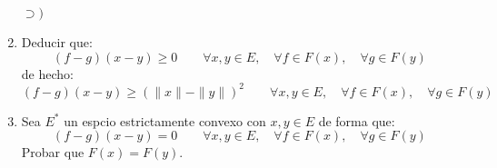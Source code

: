 \begin{ejercicio}
\begin{enumerate}[label=\alph*)]
\begin{description}
\begin{equation*}
                    \end{equation*}
                \item [$\supset )$] 
            \end{description}
        \item Deducir que:
            \begin{equation*}
                (f-g)(x-y) \geq 0 \qquad \forall x,y\in E, \quad \forall f\in F(x), \quad \forall g\in F(y)
            \end{equation*}
            de hecho:
            \begin{equation*}
                (f-g)(x-y) \geq {(\|x\|- \|y\|)}^{2} \qquad \forall x,y\in E, \quad \forall f\in F(x), \quad \forall g\in F(y)
            \end{equation*}
        \item Sea $E^\ast$ un espcio estrictamente convexo con $x,y\in E$ de forma que:
            \begin{equation*}
                (f-g)(x-y) = 0 \qquad \forall x,y\in E, \quad \forall f\in F(x), \quad \forall g\in F(y)
            \end{equation*}
            Probar que $F(x) = F(y)$.
    \end{enumerate}
\end{ejercicio}



